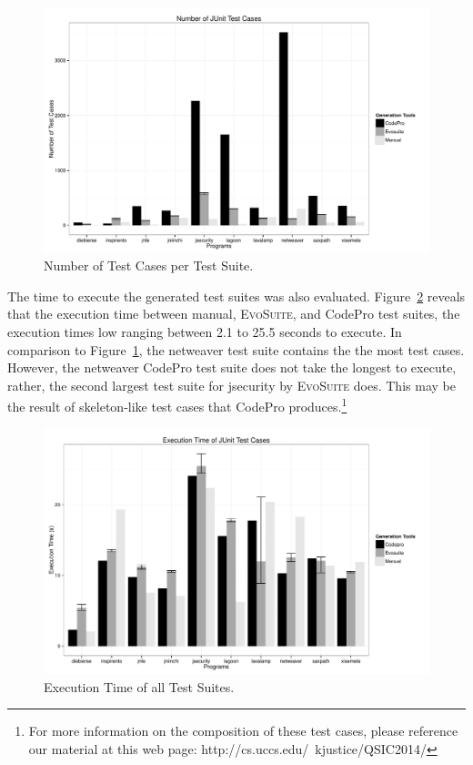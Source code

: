 \begin{figure}[!t]
\centering
  \includegraphics[width=\linewidth]{RGraphs/TestCasesGenerated.pdf}
    \caption{Number of Test Cases per Test Suite.}
  \label{fig:NumTests}
\end{figure}

The time to execute the generated test suites was also evaluated. Figure~\ref{fig:TestExecTime} reveals that the execution time between manual, \textsc{EvoSuite}, and CodePro test suites, the execution times low ranging between 2.1 to 25.5 seconds to execute. In comparison to Figure~\ref{fig:NumTests}, the netweaver test suite contains the the most test cases. However, the netweaver CodePro test suite does not take the longest to execute, rather, the second largest test suite for jsecurity by \textsc{EvoSuite} does. This may be the result of skeleton-like test cases that CodePro produces.\footnote{ For more information on the composition of these test cases, please reference our material at this web page: http://cs.uccs.edu/~kjustice/QSIC2014/} 

\begin{figure}[!t]
\centering
  \includegraphics[width=\linewidth]{RGraphs/TestExecutionTime.pdf}
    \caption{Execution Time of all Test Suites.}
  \label{fig:TestExecTime}
\end{figure}

